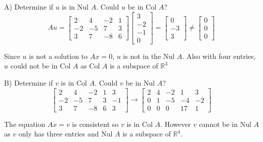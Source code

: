 \documentclass{article}
\begin{document}
   A) Determine if $ u $ is in Nul $ A $. Could $ u $ be in Col $ A $?
   \[
     Au = \begin{bmatrix}
       2 &4 &-2 &1\\
        -2 &-5 &7 &3\\
        3 &7 &-8 &6
     \end{bmatrix} \begin{bmatrix}
       3\\
       -2\\
       -1\\
       0
     \end{bmatrix} = 
     \begin{bmatrix}
       0\\
       -3\\
       3
     \end{bmatrix} \neq
     \begin{bmatrix}
       0\\
       0\\
       0
     \end{bmatrix}
   \]
   
   Since $ u $ is not a solution to $ Ax=0 $, $ u $ is not in the Nul $ A $. Also with four entries, $ u $ could not be in Col $ A $  as Col $ A $ is a subspace of $ \mathbb{R}^{3} $ 

   B) Determine if $ v $ is in Col $ A $. Could $ v $ be in Nul $ A $?
   \[
     \begin{bmatrix}
       2 &4 &-2 &1 &3\\
        -2 &-5 &7 &3 &-1\\
        3 &7 &-8 &6 &3
     \end{bmatrix} \to 
     \begin{bmatrix}
       2 &4 &-2 &1 &3\\
       0  &1 &-5 &-4 &-2\\
       0 &0 &0 &17 &1
     \end{bmatrix}
   \]
   
   The equation $ Ax=v $ is consistent so $ v $ is in Col $ A $. However $ v $ cannot be in Nul $ A $ as $ v $ only has three entries and Nul $ A $ is a subspace of $ \mathbb{R}^{4} $. 
\end{document}
